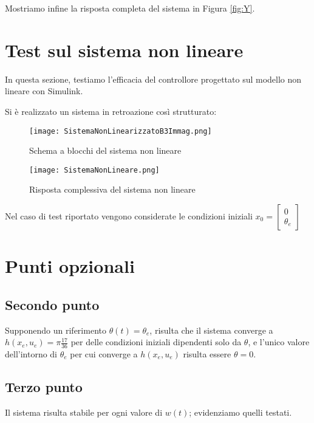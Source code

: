 \documentclass[a4paper, 11pt]{article}
\begin{document}
	Mostriamo infine la risposta completa del sistema in Figura \ref{fig:Y}.
	
	
	\clearpage
	
	\section{Test sul sistema non lineare}
	
	In questa sezione, testiamo l'efficacia del controllore progettato sul modello non lineare con Simulink.
	
	Si è realizzato un sistema in retroazione così strutturato:
	
	\begin{figure}[h]
		\centering
		\texttt{[image: SistemaNonLinearizzatoB3Immag.png]}
		\caption{Schema a blocchi del sistema non lineare}
		\label{fig:SistemaNonLineare}
	\end{figure}
	
	
	\begin{figure}[h]
		\centering
		\texttt{[image: SistemaNonLineare.png]}
		\caption{Risposta complessiva del sistema non lineare}
		\label{fig:RispostaNonLineare}
	\end{figure}
	Nel caso di test riportato vengono considerate le condizioni iniziali $x_0 = \begin{bmatrix}
		0 \\
		\theta_e
	\end{bmatrix}$
	\newpage
	
	\section{Punti opzionali}
	
	\subsection{Secondo punto}
	Supponendo un riferimento $\theta(t) = \theta_e$, risulta che il sistema converge a $h(x_e,u_e) = \pi\frac{17}{36}$ per delle condizioni iniziali dipendenti solo da $\theta$, e l'unico valore dell'intorno di $\theta_e$ per cui converge a  $h(x_e,u_e)$ risulta essere $\theta=0$.
	
	\subsection{Terzo punto}
	
	Il sistema risulta stabile per ogni valore di $w(t)$; evidenziamo quelli testati.
	
\end{document}
